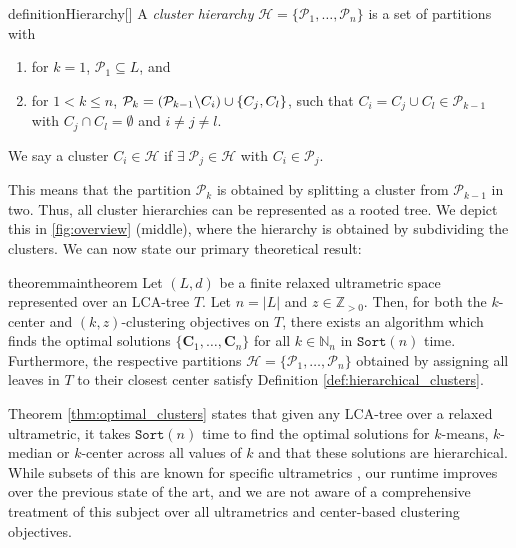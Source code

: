 \begin{restatable}{definition}{Hierarchy}[\citet{hierarchical_center_based}]
    \label{def:hierarchical_clusters}
     A \emph{cluster hierarchy} $\mathcal{H} = \{\mathcal{P}_1, \ldots, \mathcal{P}_n\}$ is a set of partitions with
    \begin{enumerate}[topsep=0pt,itemsep=0ex,partopsep=0ex,parsep=1ex]
        \item for $k=1$, $\mathcal{P}_1 \subseteq L$, and
        \item for $1 < k \leq n$, $\mathcal{P}_k = \left( \mathcal{P}_{k-1} \symbol{92} C_i \right) \cup \{C_j, C_l\}$, such that $C_i = C_j \cup C_l \in \mathcal{P}_{k-1}$ with $C_j \cap C_l = \emptyset$ and $i \neq j \neq l$.
    \end{enumerate}
    We say a cluster $C_i \in \mathcal{H}$ if $\exists \; \mathcal{P}_j \in \mathcal{H}$ with $C_i \in \mathcal{P}_j$.
\end{restatable}
\noindent This means that the partition $\mathcal{P}_k$ is obtained by splitting a cluster from $\mathcal{P}_{k-1}$ in two. 
Thus, all cluster hierarchies can be represented as a rooted tree. We depict this in \cref{fig:overview} (middle), where the hierarchy is obtained by subdividing the clusters. We can now state our primary theoretical result:
%
\begin{restatable}{theorem}{maintheorem}
    \label{thm:optimal_clusters}
    Let $(L, d)$ be a finite relaxed ultrametric space represented over an LCA-tree $T$. Let $n = |L|$ and $z \in \mathbb{Z}_{>0}$.
    Then, for both the $k$-center and $(k, z)$-clustering objectives on $T$, there exists an algorithm which finds the optimal solutions $\{\mathbf{C}_1, \ldots, \mathbf{C}_n\}$ for all $k \in \mathbb{N}_n$ in $\texttt{Sort}(n)$ time. Furthermore, the respective partitions $\mathcal{H} = \{\mathcal{P}_1, \ldots, \mathcal{P}_n\}$ obtained by assigning all leaves in $T$ to their closest center satisfy Definition \ref{def:hierarchical_clusters}.
\end{restatable}
%
Theorem \ref{thm:optimal_clusters} states that given any LCA-tree over a relaxed ultrametric, it takes $\texttt{Sort}(n)$ time to find the optimal solutions for $k$-means, $k$-median or $k$-center across all values of $k$ and that these solutions are hierarchical. While subsets of this are known for specific ultrametrics \cite{hierarchical_kmedian, beer2023connecting}, our runtime improves over the previous state of the art, and we are not aware of a comprehensive treatment of this subject over all ultrametrics and center-based clustering objectives.
